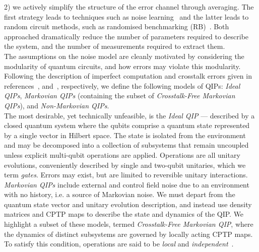 2) we actively simplify the structure of the error channel through averaging. The first strategy leads to techniques such as 
noise learning~\cite{flammia_efficient_2020,harper_efficient_2020} and the latter leads to random circuit methods, such as randomised benchmarking (RB)~\cite{magesan_scalable_2011, magesan_characterizing_2012, erhard_characterizing_2019}. Both approached dramatically reduce the number of parameters required to describe the system, and the number of measurements required to extract them. \\
The assumptions on the noise model are cleanly motivated by considering the modularity of quantum circuits, and how errors may violate this modularity.
Following the description of imperfect computation and crosstalk errors given in references~\cite{hashim_practical_2025}, and~\cite{sarovar_detecting_2020}, respectively, we define the following models of QIPs: \emph{Ideal QIPs}, \emph{Markovian QIPs} (containing the subset of \emph{Crosstalk-Free Markovian QIPs}), and \emph{Non-Markovian QIPs}.\\
The most desirable, yet technically unfeasible, is the \emph{Ideal QIP} --- described by a closed quantum system where the qubits comprise a quantum state represented by a single vector in Hilbert space. The state is isolated from the environment and may be decomposed into a collection of subsystems that remain uncoupled unless explicit multi-qubit operations are applied. Operations are all unitary evolutions, conveniently described by single and two-qubit unitaries, which we term \emph{gates}. Errors may exist, but are limited to reversible unitary interactions.\\ 
\emph{Markovian QIPs} include external and control field noise due to an environment with no history, i.e. a source of Markovian noise. We must depart from the quantum state vector and unitary evolution description, and instead use density matrices and CPTP maps to describe the state and dynamics of the QIP.
We highlight a subset of these models, termed \emph{Crosstalk-Free Markovian QIP}, where the dynamics of distinct subsystems are governed by locally acting CPTP maps. To satisfy this condition, operations are said to be \emph{local} and \emph{independent}~\cite{sarovar_detecting_2020}.
